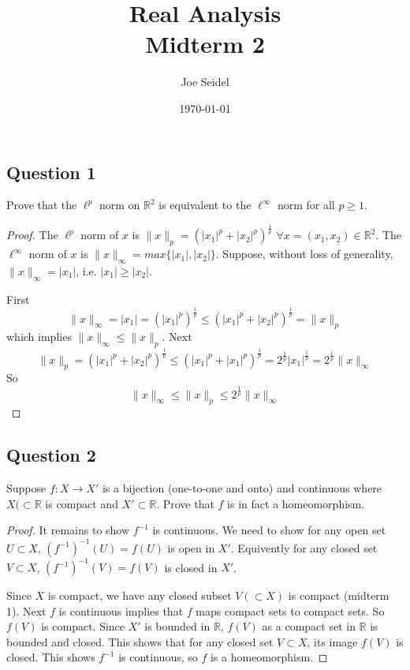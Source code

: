 \documentclass{tufte-book}
\title{Real Analysis\\Midterm 2}
\author{Joe Seidel}
\date{\today}
\theoremstyle{mytheoremstyle}
\theoremstyle{mylemstyle}
\theoremstyle{mydefstyle}
\begin{document}
\maketitle
{}
\newpage
{}

\subsection{Question 1}
Prove that the $\ell^p$ norm on $\mathbb{R}^2$ is equivalent to the $\ell^\infty$ norm for all $p \geq 1$.

\begin{proof}
The $\ell^p$ norm of $x$ is $\|x\|_p = (|x_1|^p + |x_2|^p)^{\frac{1}{p}}$ $\forall x = (x_1,x_2) \in \mathbb{R}^2$.  The $\ell^\infty$ norm of $x$ is $\|x\|_\infty = max\{|x_1|, |x_2|\}$.  Suppose, without loss of generality, $\|x\|_\infty = |x_1|$, i.e. $|x_1| \geq |x_2|$.

First 
\[ \|x\|_\infty = |x_1| = (|x_1|^p)^\frac{1}{p} \leq (|x_1|^p + |x_2|^p)^\frac{1}{p} = \|x\|_p \]
which implies $\|x\|_\infty \leq \|x\|_p$.
Next
\[ \|x\|_p = (|x_1|^p + |x_2|^p)^{\frac{1}{p}} \leq (|x_1|^p + |x_1|^p)^\frac{1}{p} = 2^\frac{1}{p}|x_1|^\frac{1}{p} = 2^\frac{1}{p}\|x\|_\infty \]
So
\[ \|x\|_\infty \leq \|x\|_p \leq 2^\frac{1}{p}\|x\|_\infty \]

\end{proof}

\subsection{Question 2}
Suppose $f: X \to X'$ is a bijection (one-to-one and onto) and continuous where $X(\subset \mathbb{R}$ is compact and $X' \subset \mathbb{R}$.  Prove that $f$ is in fact a homeomorphism.

\begin{proof}
It remains to show $f^{-1}$ is continuous.  We need to show for any open set $U \subset X$, $(f^{-1})^{-1}(U) = f(U)$ is open in $X'$.  Equivently for any closed set $V \subset X$, $(f^{-1})^{-1}(V) = f(V)$  is closed in $X'$.

Since $X$ is compact, we have any closed subset $V(\subset X)$ is compact (midterm 1).  Next $f$ is continuous implies that $f$ maps compact sets to compact sets. So $f(V)$ is compact.  Since $X'$ is bounded in $\mathbb{R}$, $f(V)$ as a compact set in $\mathbb{R}$ is bounded and closed.  This shows that for any closed set $V \subset X$, its image $f(V)$ is closed.  This shows $f^{-1}$ is continuous, so $f$ is a homeomorphism.
\end{proof}
\end{document}
